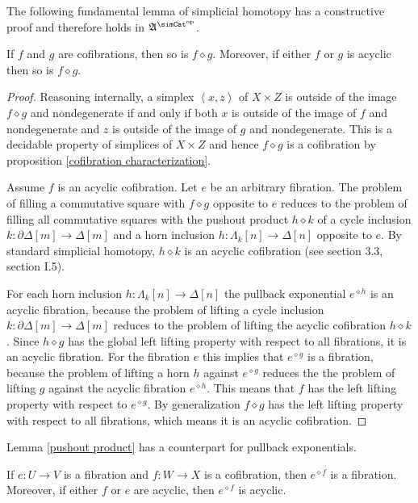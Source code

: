 \documentclass{tac}
\newcommand\dual{^{\mathrm{op}}}
\newcommand\s{^{\simCat\dual}}
\newcommand\of{:}
\newcommand\simplex\Delta
\newcommand\cycle{\partial\Delta}
\newcommand\horn\Lambda
\newcommand\tuplet[1]{\left\langle #1 \right\rangle}
\newcommand\pe[1]{^{\diamond #1}}
\newcommand\pp{\mathbin\diamond}
\newcommand\ambient{\mathfrak A}
\begin{document}
The following fundamental lemma of simplicial homotopy has a constructive proof and therefore holds in $\ambient\s$.

\begin{lemma} If $f$ and $g$ are cofibrations, then so is $f\pp g$. Moreover, if either $f$ or $g$ is acyclic then so is $f\pp g$. \label{pushout product} \end{lemma}

\begin{proof} Reasoning internally, a simplex $\tuplet{x,z}$ of $X\times Z$ is outside of the image $f\pp g$ and nondegenerate if and only if both $x$ is outside of the image of $f$ and nondegenerate and $z$ is outside of the image of $g$ and nondegenerate. This is a decidable property of simplices of $X\times Z$ and hence $f\pp g$ is a cofibration by proposition \ref{cofibration characterization}. 

Assume $f$ is an acyclic cofibration. Let $e$ be an arbitrary fibration. The problem of filling a commutative square with $f\pp g$ opposite to $e$ reduces to the problem of filling all commutative squares with the pushout product $h\pp k$ of a cycle inclusion $k\of \cycle[m]\to \simplex[m]$ and a horn inclusion $h\of \horn_k[n]\to\simplex[n]$ opposite to $e$. By standard simplicial homotopy, $h\pp k$ is an acyclic cofibration (see \cite{Hovey99} section 3.3, \cite{GJSHT} section I.5).

For each horn inclusion $h\of \horn_k[n]\to \simplex[n]$ the pullback exponential $e\pe h$ is an acyclic fibration, because the problem of lifting a cycle inclusion $k\of \cycle[m]\to \simplex[m]$ reduces to the problem of lifting the acyclic cofibration $h\pp k$. Since $h\pp g$ has the global left lifting property with respect to all fibrations, it is an acyclic fibration. For the fibration $e$ this implies that $e\pe g$ is a fibration, because the problem of lifting a horn $h$ against $e\pe g$ reduces the the problem of lifting $g$ against the acyclic fibration $e\pe h$. This means that $f$ has the left lifting property with respect to $e\pe g$. By generalization $f\pp g$ has the left lifting property with respect to all fibrations, which means it is an acyclic cofibration.
\end{proof}

Lemma \ref{pushout product} has a counterpart for pullback exponentials.

\begin{corollary} If $e\of U\to V$ is a fibration and $f\of W\to X$ is a cofibration, then $e\pe f$ is a fibration. Moreover, if either $f$ or $e$ are acyclic, then $e\pe f$ is acyclic. \label{pullback exponential}
\end{corollary}
\end{document}
